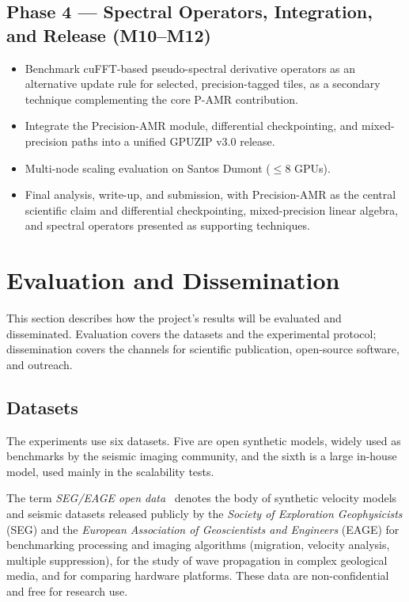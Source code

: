 \documentclass[12pt,a4paper]{article}
\newcommand{\pamr}{P\nobreakdash-AMR}
\begin{document}
\subsection{Phase 4 --- Spectral Operators, Integration, and Release (M10--M12)}

\begin{itemize}
  \item Benchmark cuFFT-based pseudo-spectral derivative operators as an
        alternative update rule for selected, precision-tagged tiles, as a
        secondary technique complementing the core \pamr{} contribution.
  \item Integrate the Precision-AMR module, differential checkpointing, and
        mixed-precision paths into a unified GPUZIP v3.0 release.
  \item Multi-node scaling evaluation on Santos Dumont ($\leq$8 GPUs).
  \item Final analysis, write-up, and submission, with Precision-AMR as the
        central scientific claim and differential checkpointing, mixed-precision
        linear algebra, and spectral operators presented as supporting
        techniques.
\end{itemize}

\fi

\section{Evaluation and Dissemination}

This section describes how the project's results will be evaluated and
disseminated. Evaluation covers the datasets and the experimental
protocol; dissemination covers the channels for scientific publication,
open-source software, and outreach.

\subsection{Datasets}

The experiments use six datasets. Five are open synthetic models, widely
used as benchmarks by the seismic imaging community, and the sixth is a
large in-house model, used mainly in the scalability tests.

The term \emph{SEG/EAGE open data}~\cite{segopendata} denotes the body of
synthetic velocity models and seismic datasets released publicly by the
\emph{Society of Exploration Geophysicists} (SEG) and the \emph{European
Association of Geoscientists and Engineers} (EAGE) for benchmarking
processing and imaging algorithms (migration, velocity analysis, multiple
suppression), for the study of wave propagation in complex geological
media, and for comparing hardware platforms. These data are
non-confidential and free for research use.
\end{document}
